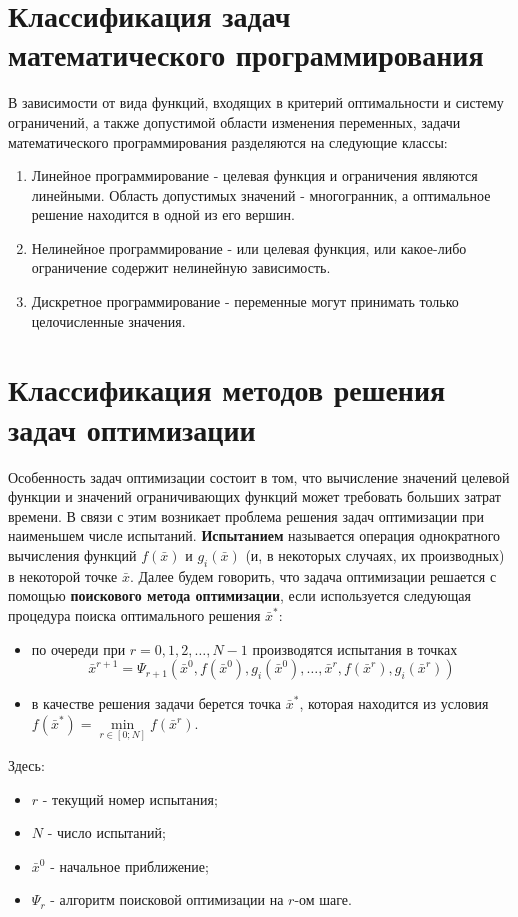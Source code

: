 \documentclass[a4paper,12pt]{report}
\begin{document}
\section{Классификация задач математического программирования}
В зависимости от вида функций, входящих в критерий оптимальности и систему ограничений, а также допустимой области изменения переменных, задачи математического программирования разделяются на следующие классы:
\begin{enumerate}
\item Линейное программирование - целевая функция и ограничения являются линейными. Область допустимых значений - многогранник, а оптимальное решение находится в одной из его вершин.
\item Нелинейное программирование - или целевая функция, или какое-либо ограничение содержит нелинейную зависимость.
\item Дискретное программирование - переменные могут принимать только целочисленные значения.
\end{enumerate}

\section{Классификация методов решения задач оптимизации}
\label{sec:ClassMetOpt}
Особенность задач оптимизации состоит в том, что вычисление значений целевой функции и значений ограничивающих функций может требовать больших затрат времени. В связи с этим возникает проблема решения задач оптимизации при наименьшем числе испытаний.
\textbf{Испытанием} называется операция однократного вычисления функций $f(\bar{x})$ и $g_{i}(\bar{x})$ (и, в некоторых случаях, их производных) в некоторой точке $\bar{x}$.
Далее будем говорить, что задача оптимизации решается с помощью \textbf{поискового метода оптимизации}, если используется следующая процедура поиска оптимального решения $\bar{x}^{*}$:
\begin{itemize}
\item по очереди при $r=0,1,2,\ldots,N-1$ производятся испытания в точках
\begin{equation}
\label{eq:num5}
\bar{x}^{r+1} = \Psi_{r+1}\left(\bar{x}^{0}, f(\bar{x}^{0}), g_{i}(\bar{x}^{0}),\ldots,\bar{x}^{r}, f(\bar{x}^{r}), g_{i}(\bar{x}^{r})\right)
\end{equation}
\item в качестве решения задачи берется точка $\bar{x}^{*}$, которая находится из условия $f(\bar{x}^{*})=\underset{r\in[0;N]}{\min}f(\bar{x}^{r})$.
\end{itemize}
Здесь:
\begin{itemize}
\item $r$ - текущий номер испытания;
\item $N$ - число испытаний;
\item $\bar{x}^{0}$ - начальное приближение;
\item $\Psi_{r}$ - алгоритм поисковой оптимизации на $r$-ом шаге.
\end{itemize}
\end{document}
